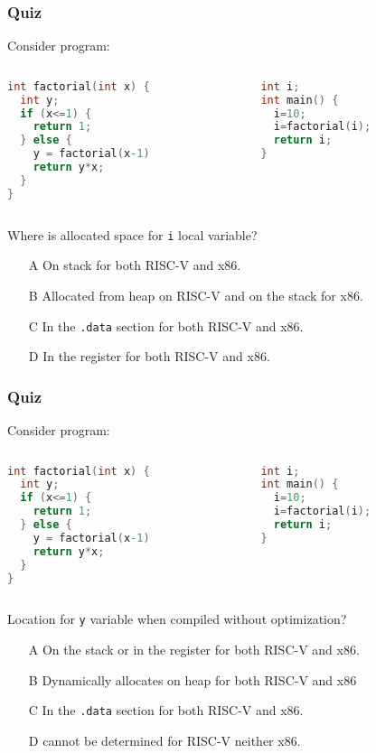 \documentclass{beamer}
\begin{document}
\begin{frame}[fragile]
\frametitle{Quiz}

Consider program:
\begin{columns}
\begin{column}{0.45\textwidth}
\begin{lstlisting}[language={C},columns=flexible]
int factorial(int x) {
  int y;
  if (x<=1) {
    return 1;
  } else {
    y = factorial(x-1)
    return y*x;
  }
}
\end{lstlisting}
\end{column}
\hfill
\begin{column}{0.45\textwidth}  
\begin{lstlisting}[language={C},columns=flexible]
int i;
int main() {
  i=10;
  i=factorial(i);
  return i;
}
\end{lstlisting}
\end{column}
\end{columns}

Where is allocated space for \texttt{i} local variable?
\begin{itemize}
\item[A] On stack for both RISC-V and x86.
\item[B] Allocated from heap on RISC-V and on the stack for x86.
\item[C] In the \texttt{.data} section for both RISC-V and x86.
\item[D] In the register for both RISC-V and x86.
\end{itemize}
\end{frame}


\begin{frame}[fragile]
\frametitle{Quiz}

Consider program:
\begin{columns}
\begin{column}{0.45\textwidth}
\begin{lstlisting}[language={C},columns=flexible]
int factorial(int x) {
  int y;
  if (x<=1) {
    return 1;
  } else {
    y = factorial(x-1)
    return y*x;
  }
}
\end{lstlisting}
\end{column}
\hfill
\begin{column}{0.45\textwidth}  
\begin{lstlisting}[language={C},columns=flexible]
int i;
int main() {
  i=10;
  i=factorial(i);
  return i;
}
\end{lstlisting}
\end{column}
\end{columns}

Location for \texttt{y} variable when compiled without optimization?
\begin{itemize}
\item[A] On the stack or in the register for both RISC-V and x86.
\item[B] Dynamically allocates on heap for both RISC-V and x86
\item[C] In the \texttt{.data} section for both RISC-V and x86.
\item[D] cannot be determined for RISC-V neither x86.
\end{itemize}
\end{frame}
\end{document}
